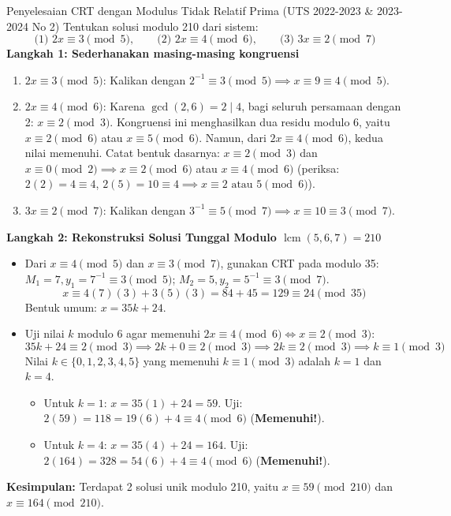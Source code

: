 \documentclass[11pt,a4paper]{article}
\begin{document}
\begin{rumusbox}{Penyelesaian CRT dengan Modulus Tidak Relatif Prima (UTS 2022-2023 \& 2023-2024 No 2)}
Tentukan solusi modulo 210 dari sistem:
\[
\text{(1) } 2x \equiv 3 \pmod 5, \qquad \text{(2) } 2x \equiv 4 \pmod 6, \qquad \text{(3) } 3x \equiv 2 \pmod 7
\]
\textbf{Langkah 1: Sederhanakan masing-masing kongruensi}
\begin{enumerate}
    \item $2x \equiv 3 \pmod 5$: Kalikan dengan $2^{-1} \equiv 3 \pmod 5 \implies x \equiv 9 \equiv 4 \pmod 5$.
    \item $2x \equiv 4 \pmod 6$: Karena $\gcd(2, 6) = 2 \mid 4$, bagi seluruh persamaan dengan 2: $x \equiv 2 \pmod 3$. Kongruensi ini menghasilkan dua residu modulo 6, yaitu $x \equiv 2 \pmod 6$ atau $x \equiv 5 \pmod 6$. Namun, dari $2x \equiv 4 \pmod 6$, kedua nilai memenuhi. Catat bentuk dasarnya: $x \equiv 2 \pmod 3$ dan $x \equiv 0 \pmod 2 \implies x \equiv 2 \pmod 6$ atau $x \equiv 4 \pmod 6$ (periksa: $2(2)=4 \equiv 4$, $2(5)=10 \equiv 4 \implies x \equiv 2 \text{ atau } 5 \pmod 6$).
    \item $3x \equiv 2 \pmod 7$: Kalikan dengan $3^{-1} \equiv 5 \pmod 7 \implies x \equiv 10 \equiv 3 \pmod 7$.
\end{enumerate}
\textbf{Langkah 2: Rekonstruksi Solusi Tunggal Modulo $\operatorname{lcm}(5, 6, 7) = 210$}
\begin{itemize}
    \item Dari $x \equiv 4 \pmod 5$ dan $x \equiv 3 \pmod 7$, gunakan CRT pada modulo 35:
    $M_1 = 7, y_1 = 7^{-1} \equiv 3 \pmod 5$; $M_2 = 5, y_2 = 5^{-1} \equiv 3 \pmod 7$.
    \[
    x \equiv 4(7)(3) + 3(5)(3) = 84 + 45 = 129 \equiv 24 \pmod{35}
    \]
    Bentuk umum: $x = 35k + 24$.
    \item Uji nilai $k$ modulo 6 agar memenuhi $2x \equiv 4 \pmod 6 \iff x \equiv 2 \pmod 3$:
    \[
    35k + 24 \equiv 2 \pmod 3 \implies 2k + 0 \equiv 2 \pmod 3 \implies 2k \equiv 2 \pmod 3 \implies k \equiv 1 \pmod 3
    \]
    Nilai $k \in \{0, 1, 2, 3, 4, 5\}$ yang memenuhi $k \equiv 1 \pmod 3$ adalah $k = 1$ dan $k = 4$.
    \begin{itemize}
        \item Untuk $k = 1$: $x = 35(1) + 24 = 59$. Uji: $2(59) = 118 = 19(6) + 4 \equiv 4 \pmod 6$ (\textbf{Memenuhi!}).
        \item Untuk $k = 4$: $x = 35(4) + 24 = 164$. Uji: $2(164) = 328 = 54(6) + 4 \equiv 4 \pmod 6$ (\textbf{Memenuhi!}).
    \end{itemize}
\end{itemize}
\textbf{Kesimpulan:} Terdapat 2 solusi unik modulo 210, yaitu $x \equiv 59 \pmod{210}$ dan $x \equiv 164 \pmod{210}$.
\end{rumusbox}
\end{document}
